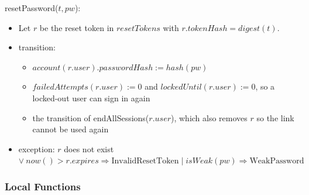 \documentclass[12pt, titlepage]{article}
\begin{document}
\noindent resetPassword($t, \mathit{pw}$):
\begin{itemize}
\item Let $r$ be the reset token in $\mathit{resetTokens}$ with
  $r.\mathit{tokenHash} = \mathit{digest}(t)$.
\item transition:
  \begin{itemize}
  \item $\mathit{account}(r.\mathit{user}).\mathit{passwordHash} :=
    \mathit{hash}(\mathit{pw})$
  \item $\mathit{failedAttempts}(r.\mathit{user}) := 0$ and
    $\mathit{lockedUntil}(r.\mathit{user}) := 0$, so a locked-out user can
    sign in again
  \item the transition of endAllSessions($r.\mathit{user}$), which also
    removes $r$ so the link cannot be used again
  \end{itemize}
\item exception: $r$ does not exist $\vee\ \mathit{now}() > r.\mathit{expires} \Rightarrow \mathrm{InvalidResetToken}
  \mid \mathit{isWeak}(\mathit{pw}) \Rightarrow \mathrm{WeakPassword}$
\end{itemize}

\subsubsection{Local Functions}
\end{document}
